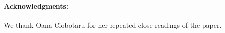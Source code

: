 \paragraph{Acknowledgments:}

We thank Oana Ciobotaru for her repeated close readings of the paper.




\endinput




As a field, anonymous credentials come in myriad flavors,
many of which exist to limits the anonymity provided, ala
 attribute based credentials and group signatures. %
%
Ring VRFs by weakening anonymity only contextually provide a safer,
more private, more flexible, more powerful, and more ethical
choice for all everyday anonymous credential use cases.  %


